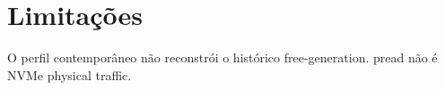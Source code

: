 \section{Limitações}
O perfil contemporâneo não reconstrói o histórico free-generation. pread não é NVMe physical traffic.
